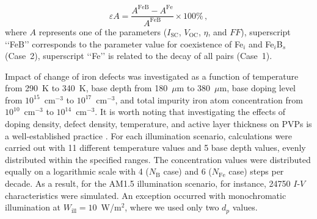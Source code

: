 \documentclass[a4paper,fleqn]{cas-sc}
\begin{document}
\begin{equation}
\label{eq1}
    \varepsilon A = \frac{A^\mathrm{FeB} - A^\mathrm{Fe}}{A^\mathrm{FeB}} \times 100 \%\,,
\end{equation}
where $A$ represents one of the parameters ($I_\mathrm{SC}$, $V_\mathrm{OC}$, $\eta$, and $F\!F$),
superscript ‘‘FeB’’ corresponds to the parameter value for coexistence of Fe$_i$ and Fe$_i$B$_s$ (Case~2),
superscript ‘‘Fe’’ is related to the decay of all pairs (Case~1).


Impact of change of iron defects was investigated as a function of temperature from 290~K to 340~K,
base depth from 180~$\mu$m to 380~$\mu$m,
base doping level from $10^{15}$~cm$^{-3}$ to $10^{17}$~cm$^{-3}$,
and total impurity iron atom concentration from $10^{10}$~cm$^{-3}$ to $10^{14}$~cm$^{-3}$.
It is worth noting that investigating the effects of doping density, defect density, temperature, and active layer thickness on PVPs is a well-established practice \cite{MasumMia2025,Rahman2024,Sultana2024}.
For each illumination scenario, calculations were carried out with 11 different temperature values and 5 base depth values,
evenly distributed within the specified ranges.
The concentration values were distributed equally on a logarithmic scale with 4 ($N_\mathrm{B}$ case) and 6 ($N_\mathrm{Fe}$ case) steps per decade.
As a result, for the AM1.5 illumination scenario, for instance, 24750 $I$-$V$ characteristics were simulated.
An exception occurred with monochromatic illumination at $W_\mathrm{ill} = 10$~W/m$^{2}$,
where we used only two $d_p$ values.
\end{document}
